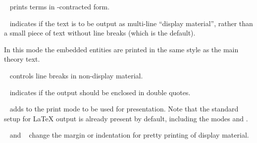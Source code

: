 \begin{isabellebody}
\begin{isamarkuptext}
\begin{description}
  \item {}\hypertarget{antiquotation option.eta-contract}{\hyperlink{antiquotation option.eta-contract}{\mbox{}}}~
  prints terms in \isa{{\isasymeta}}-contracted form.

  \item {}\hypertarget{antiquotation option.display}{\hyperlink{antiquotation option.display}{\mbox{}}}~ indicates
  if the text is to be output as multi-line ``display material'',
  rather than a small piece of text without line breaks (which is the
  default).

  In this mode the embedded entities are printed in the same style as
  the main theory text.

  \item {}\hypertarget{antiquotation option.break}{\hyperlink{antiquotation option.break}{\mbox{}}}~ controls
  line breaks in non-display material.

  \item {}\hypertarget{antiquotation option.quotes}{\hyperlink{antiquotation option.quotes}{\mbox{}}}~ indicates
  if the output should be enclosed in double quotes.

  \item {}\hypertarget{antiquotation option.mode}{\hyperlink{antiquotation option.mode}{\mbox{}}}~ adds  to the print mode to be used for presentation.  Note that the
  standard setup for {\LaTeX} output is already present by default,
  including the modes  and .

  \item {}\hypertarget{antiquotation option.margin}{\hyperlink{antiquotation option.margin}{\mbox{}}}~ and
  \hypertarget{antiquotation option.indent}{\hyperlink{antiquotation option.indent}{\mbox{}}}~ change the margin
  or indentation for pretty printing of display material.


\end{description}
\end{isamarkuptext}
\end{isabellebody}
